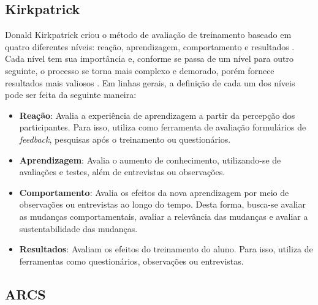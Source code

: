 \subsection{Kirkpatrick}
\label{Kirkpatrick}

Donald Kirkpatrick criou o método de avaliação de treinamento baseado em quatro diferentes níveis: reação, aprendizagem, comportamento e resultados \cite{donald1994evaluating}. Cada nível tem sua importância e, conforme se passa de um nível para outro seguinte, o processo se torna mais complexo e demorado, porém fornece resultados mais valiosos \cite{chapman2009kirkpatrick}. Em linhas gerais, a definição de cada um dos níveis pode ser feita da seguinte maneira:


\begin{itemize}[label={},leftmargin=2em]
\item \textbf{Reação}: Avalia a experiência de aprendizagem a partir da percepção dos participantes. Para isso, utiliza como ferramenta de avaliação formulários de \textit{feedback}, pesquisas após o treinamento ou questionários.
\end{itemize}



\begin{itemize}[label={},leftmargin=2em]
\item \textbf{Aprendizagem}: Avalia o aumento de conhecimento, utilizando-se de avaliações e testes, além de entrevistas ou observações.
\end{itemize}

\begin{itemize}[label={},leftmargin=2em]
\item \textbf{Comportamento}: Avalia os efeitos da nova aprendizagem por meio de observações ou entrevistas ao longo do tempo. Desta forma, busca-se avaliar as mudanças comportamentais, avaliar a relevância das mudanças e avaliar a sustentabilidade das mudanças. 
\end{itemize}

\begin{itemize}[label={},leftmargin=2em]
\item \textbf{Resultados}: Avaliam os efeitos do treinamento do aluno. Para isso, utiliza de ferramentas como questionários, observações ou entrevistas.
\end{itemize}


\pagebreak

\subsection{ARCS}
\label{ARCS}

